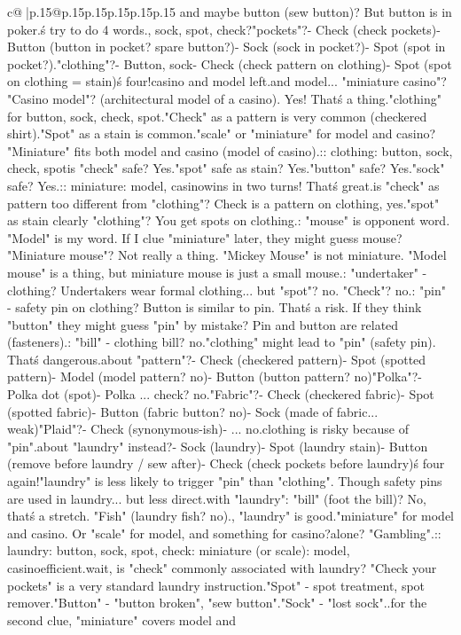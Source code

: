 \documentclass{article}
\begin{document}
{\begin{supertabular}{c@{$\;$}|p{.15\linewidth}@{}p{.15\linewidth}p{.15\linewidth}p{.15\linewidth}p{.15\linewidth}p{.15\linewidth}}
{{{and maybe button (sew button)? But button is in poker.\n\nLet\'s try to do 4 words.\nbutton, sock, spot, check?\n"pockets"?\n- Check (check pockets)\n- Button (button in pocket? spare button?)\n- Sock (sock in pocket?)\n- Spot (spot in pocket?)\nWeak.\n\n"clothing"?\n- Button, sock\n- Check (check pattern on clothing)\n- Spot (spot on clothing = stain)\nThat\'s four!\nThen casino and model left.\nCasino and model... "miniature casino"? "Casino model"? (architectural model of a casino). Yes! That\'s a thing.\n\nSo "clothing" for button, sock, check, spot.\n"Check" as a pattern is very common (checkered shirt).\n"Spot" as a stain is common.\nThen "scale" or "miniature" for model and casino? "Miniature" fits both model and casino (model of casino).\n\nSo:\nCLUE: clothing\nTARGETS: button, sock, check, spot\n\nBut is "check" safe? Yes.\nIs "spot" safe as stain? Yes.\nIs "button" safe? Yes.\nIs "sock" safe? Yes.\n\nThen:\nCLUE: miniature\nTARGETS: model, casino\n\nThis wins in two turns! That\'s great.\n\nBut is "check" as pattern too different from "clothing"? Check is a pattern on clothing, yes.\nIs "spot" as stain clearly "clothing"? You get spots on clothing.\n\nRisk: "mouse" is opponent word. "Model" is my word. If I clue "miniature" later, they might guess mouse? "Miniature mouse"? Not really a thing. "Mickey Mouse" is not miniature. "Model mouse" is a thing, but miniature mouse is just a small mouse.\n\nRisk: "undertaker" - clothing? Undertakers wear formal clothing... but "spot"? no. "Check"? no.\nRisk: "pin" - safety pin on clothing? Button is similar to pin. That\'s a risk. If they think "button" they might guess "pin" by mistake? Pin and button are related (fasteners).\nRisk: "bill" - clothing bill? no.\n\nSo "clothing" might lead to "pin" (safety pin). That\'s dangerous.\n\nWhat about "pattern"?\n- Check (checkered pattern)\n- Spot (spotted pattern)\n- Model (model pattern? no)\n- Button (button pattern? no)\n\n"Polka"?\n- Polka dot (spot)\n- Polka ... check? no.\n\n"Fabric"?\n- Check (checkered fabric)\n- Spot (spotted fabric)\n- Button (fabric button? no)\n- Sock (made of fabric... weak)\n\n"Plaid"?\n- Check (synonymous-ish)\n- ... no.\n\nSo clothing is risky because of "pin".\n\nWhat about "laundry" instead?\n- Sock (laundry)\n- Spot (laundry stain)\n- Button (remove before laundry / sew after)\n- Check (check pockets before laundry)\nThat\'s four again!\nAnd "laundry" is less likely to trigger "pin" than "clothing". Though safety pins are used in laundry... but less direct.\n\nRisk with "laundry": "bill" (foot the bill)? No, that\'s a stretch. "Fish" (laundry fish? no).\n\nActually, "laundry" is good.\n\nThen "miniature" for model and casino. Or "scale" for model, and something for casino?\n\nCasino alone? "Gambling".\n\nSo:\nCLUE: laundry\nTARGETS: button, sock, spot, check\n\nCLUE: miniature (or scale)\nTARGETS: model, casino\n\nVery efficient.\n\nBut wait, is "check" commonly associated with laundry? "Check your pockets" is a very standard laundry instruction.\n"Spot" - spot treatment, spot remover.\n"Button" - "button broken", "sew button".\n"Sock" - "lost sock".\n\nYes.\n\nAnd for the second clue, "miniature" covers model and }}}
\end{supertabular}}
\end{document}
